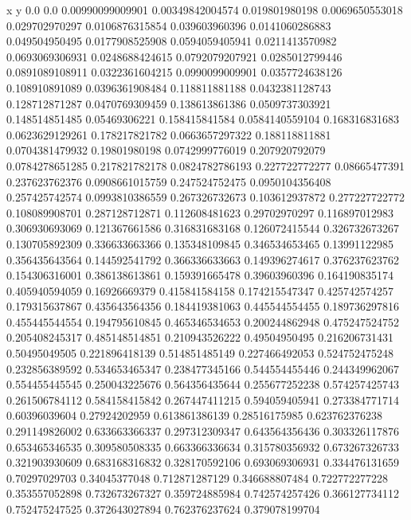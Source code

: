               x                y
            0.0              0.0
0.00990099009901  0.00349842004574
 0.019801980198  0.0069650553018
 0.029702970297  0.0106876315854
 0.039603960396  0.0141060286883
 0.049504950495  0.0177908525908
0.0594059405941  0.0211413570982
0.0693069306931  0.0248688424615
0.0792079207921  0.0285012799446
0.0891089108911  0.0322361604215
0.0990099009901  0.0357724638126
 0.108910891089  0.0396361908484
 0.118811881188  0.0432381128743
 0.128712871287  0.0470769309459
 0.138613861386  0.0509737303921
 0.148514851485    0.05469306221
 0.158415841584  0.0584140559104
 0.168316831683  0.0623629129261
 0.178217821782  0.0663657297322
 0.188118811881  0.0704381479932
  0.19801980198  0.0742999776019
 0.207920792079  0.0784278651285
 0.217821782178  0.0824782786193
 0.227722772277    0.08665477391
 0.237623762376  0.0908661015759
 0.247524752475  0.0950104356408
 0.257425742574  0.0993810386559
 0.267326732673   0.103612937872
 0.277227722772   0.108089908701
 0.287128712871   0.112608481623
  0.29702970297   0.116897012983
 0.306930693069   0.121367661586
 0.316831683168   0.126072415544
 0.326732673267   0.130705892309
 0.336633663366   0.135348109845
 0.346534653465    0.13991122985
 0.356435643564   0.144592541792
 0.366336633663   0.149396274617
 0.376237623762   0.154306316001
 0.386138613861   0.159391665478
  0.39603960396   0.164190835174
 0.405940594059    0.16926669379
 0.415841584158   0.174215547347
 0.425742574257   0.179315637867
 0.435643564356   0.184419381063
 0.445544554455   0.189736297816
 0.455445544554   0.194795610845
 0.465346534653   0.200244862948
 0.475247524752   0.205408245317
 0.485148514851   0.210943526222
  0.49504950495   0.216206731431
  0.50495049505   0.221896418139
 0.514851485149   0.227466492053
 0.524752475248   0.232856389592
 0.534653465347   0.238477345166
 0.544554455446   0.244349962067
 0.554455445545   0.250043225676
 0.564356435644   0.255677252238
 0.574257425743   0.261506784112
 0.584158415842   0.267447411215
 0.594059405941   0.273384771714
  0.60396039604    0.27924202959
 0.613861386139    0.28516175985
 0.623762376238   0.291149826002
 0.633663366337   0.297312309347
 0.643564356436   0.303326117876
 0.653465346535   0.309580508335
 0.663366336634   0.315780356932
 0.673267326733   0.321903930609
 0.683168316832   0.328170592106
 0.693069306931   0.334476131659
  0.70297029703    0.34045377048
 0.712871287129   0.346688807484
 0.722772277228   0.353557052898
 0.732673267327   0.359724885984
 0.742574257426   0.366127734112
 0.752475247525   0.372643027894
 0.762376237624   0.379078199704

